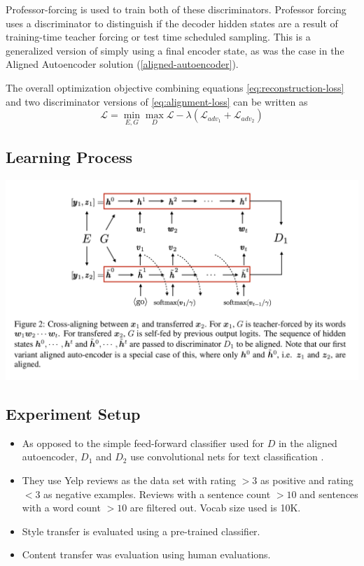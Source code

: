 \documentclass[12pt]{article}
\begin{document}
    Professor-forcing is used to train both of these discriminators. Professor forcing uses a discriminator to distinguish if the decoder hidden states are a result of training-time teacher forcing or test time scheduled sampling. This is a generalized version of simply using a final encoder state, as was the case in the Aligned Autoencoder solution (\ref{aligned-autoencoder}).

    The overall optimization objective combining equations \ref{eq:reconstruction-loss} and two discriminator versions of \ref{eq:alignment-loss} can be written as 
    \begin{equation*}
      \mathcal{L} = \operatorname*{min}_{E,G} \operatorname*{max}_{D} \mathcal{L} - \lambda (\mathcal{L}_{adv_1} + \mathcal{L}_{adv_2})
    \end{equation*}
    
    \subsection{Learning Process}
      \includegraphics[width=\textwidth]{cross-alignment-training}
    
      \subsection{Experiment Setup}
      \begin{itemize}
        \item As opposed to the simple feed-forward classifier used for $D$ in the aligned autoencoder, $D_1$ and $D_2$ use convolutional nets for text classification \cite{kim2014convolutional}.
        \item They use Yelp reviews as the data set with rating $>3$ as positive and rating $<3$ as negative examples. Reviews with a sentence count $>10$ and sentences with a word count $>10$ are filtered out. Vocab size used is 10K.
        \item Style transfer is evaluated using a pre-trained classifier. \cite{kim2014convolutional}
        \item Content transfer was evaluation using human evaluations.
      \end{itemize}
\end{document}
